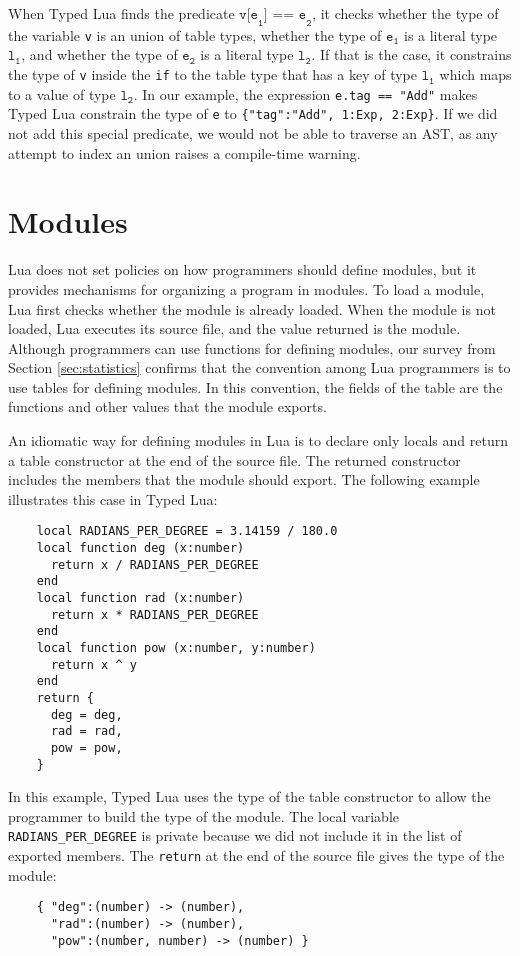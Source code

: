 When Typed Lua finds the predicate $\texttt{v[e}_{\texttt{1}}\texttt{] == e}_{\texttt{2}}$,
it checks whether the type of the variable \texttt{v} is an union of table types,
whether the type of $\texttt{e}_{\texttt{1}}$ is a literal type $\texttt{l}_{\texttt{1}}$,
and whether the type of $\texttt{e}_{\texttt{2}}$ is a literal type $\texttt{l}_{\texttt{2}}$.
If that is the case, it constrains the type of \texttt{v} inside
the \texttt{if} to the table type that has a key of type
$\texttt{l}_{\texttt{1}}$ which maps to a value of type $\texttt{l}_{\texttt{2}}$.
In our example, the expression \texttt{e.tag == "Add"} makes Typed Lua
constrain the type of \texttt{e} to \texttt{\{"tag":"Add", 1:Exp, 2:Exp\}}.
If we did not add this special predicate, we would not be able to traverse an AST,
as any attempt to index an union raises a compile-time warning.

\section{Modules}
\label{sec:modules}

Lua does not set policies on how programmers should define modules,
but it provides mechanisms for organizing a program in modules.
To load a module, Lua first checks whether the module is already loaded.
When the module is not loaded, Lua executes its source file, and
the value returned is the module.
Although programmers can use functions for defining modules,
our survey from Section \ref{sec:statistics} confirms that
the convention among Lua programmers is to use tables for defining modules. 
In this convention, the fields of the table are the functions and other
values that the module exports.

An idiomatic way for defining modules in Lua is to declare only locals
and return a table constructor at the end of the source file.
The returned constructor includes the members that the module should export.
The following example illustrates this case in Typed Lua:
\begin{verbatim}
    local RADIANS_PER_DEGREE = 3.14159 / 180.0
    local function deg (x:number)
      return x / RADIANS_PER_DEGREE
    end
    local function rad (x:number)
      return x * RADIANS_PER_DEGREE
    end
    local function pow (x:number, y:number)
      return x ^ y
    end
    return {
      deg = deg,
      rad = rad,
      pow = pow,
    }
\end{verbatim}

In this example, Typed Lua uses the type of the table constructor
to allow the programmer to build the type of the module.
The local variable \texttt{RADIANS\string_PER\string_DEGREE}
is private because we did not include it in the list of exported members. 
The \texttt{return} at the end of the source file gives the type of the module:
\begin{verbatim}
    { "deg":(number) -> (number),
      "rad":(number) -> (number),
      "pow":(number, number) -> (number) }
\end{verbatim}

